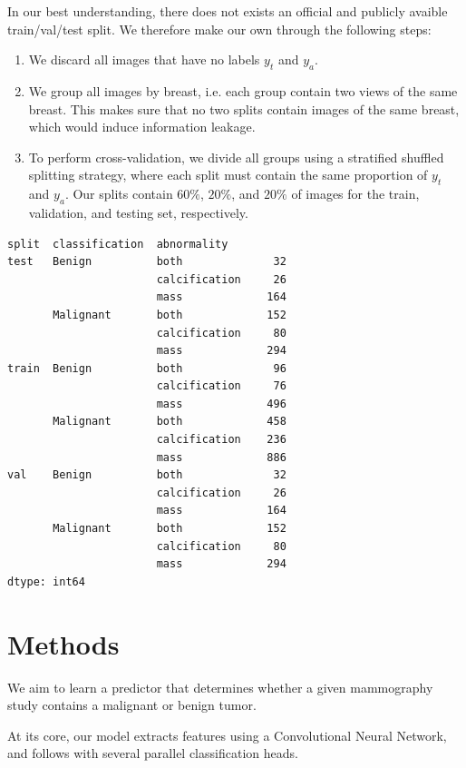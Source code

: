 \documentclass[11pt]{article}
\begin{document}
In our best understanding, there does not exists an official and publicly avaible train/val/test
split. We therefore make our own through the following steps:

\begin{enumerate}
\item We discard all images that have no labels \(y_t\) and \(y_a\).
\item We group all images by breast, i.e. each group contain two views of the same breast.
This makes sure that no two splits contain images of the same breast, which would
induce information leakage.
\item To perform cross-validation, we divide all groups using a stratified
shuffled splitting strategy, where each split
must contain the same proportion of \(y_t\) and \(y_a\). Our splits contain \(60\%\),
 \(20\%\), and \(20\%\) of images for the train, validation, and testing set, respectively.
\end{enumerate}

\begin{verbatim}
split  classification  abnormality  
test   Benign          both              32
                       calcification     26
                       mass             164
       Malignant       both             152
                       calcification     80
                       mass             294
train  Benign          both              96
                       calcification     76
                       mass             496
       Malignant       both             458
                       calcification    236
                       mass             886
val    Benign          both              32
                       calcification     26
                       mass             164
       Malignant       both             152
                       calcification     80
                       mass             294
dtype: int64
\end{verbatim}

\section{Methods}
\label{sec:orgfb261e8}

We aim to learn a predictor that determines whether a given mammography study
contains a malignant or benign tumor.

At its core, our model extracts features using a Convolutional Neural Network,
and follows with several parallel classification heads.
\end{document}
